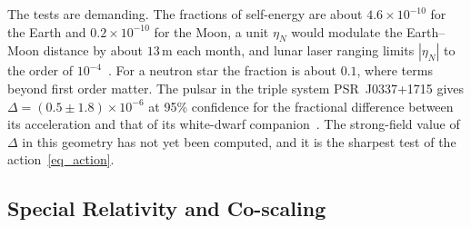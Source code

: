 \documentclass{iopjournal}
\begin{document}
The tests are demanding. The fractions of self-energy are about $4.6\times10^{-10}$ for the Earth and $0.2\times10^{-10}$ for the Moon, a unit $\eta_N$ would modulate the Earth--Moon distance by about $13$\,m each month, and lunar laser ranging limits $|\eta_N|$ to the order of $10^{-4}$~\cite{Will2014}. For a neutron star the fraction is about $0.1$, where terms beyond first order matter. The pulsar in the triple system PSR~J0337+1715 gives $\Delta=(0.5\pm1.8)\times10^{-6}$ at 95\% confidence for the fractional difference between its acceleration and that of its white-dwarf companion~\cite{Voisin2020}. The strong-field value of $\Delta$ in this geometry has not yet been computed, and it is the sharpest test of the action~\eqref{eq_action}.

\subsection{Special Relativity and Co-scaling}\label{sec_rms}
\end{document}
